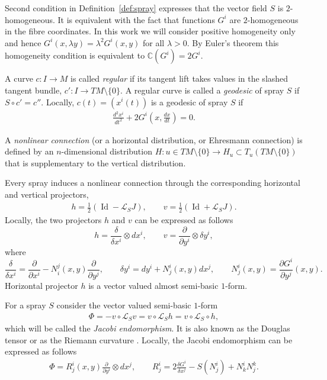 \documentclass[pdftex]{sigma}
\numberwithin{equation}{section}
\begin{document}
Second condition in Def\/inition~\ref{def:spray} expresses that the
vector f\/ield $S$ is $2$-homogeneous. It is equivalent with the
fact that functions $G^i$ are $2$-homogeneous in the f\/ibre
coordinates. In this work we will consider positive homogeneity
only and hence $G^i(x,\lambda y)=\lambda^2 G^i(x,y)$
for all $\lambda>0$. By Euler's theorem this homogeneity condition is equivalent to
$\mathbb{C}(G^i)=2G^i$.

A curve $c:I \to M$ is called \emph{regular} if its tangent lift takes
values in the slashed tangent bundle, $c': I \to
TM\setminus\{0\}$. A regular curve is called a \emph{geodesic} of
spray $S$ if $S\circ c'=c''$. Locally, $c(t)=(x^i(t))$ is a
geodesic of spray $S$ if
\begin{gather*}
\frac{d^2x^i}{dt^2}+2G^i\left(x,\frac{dx}{dt}\right)=0.
\end{gather*}

\begin{Definition} A \emph{nonlinear connection} (or a horizontal
distribution, or Ehresmann connection) is def\/ined by an
$n$-dimensional distribution $H: u\in TM\setminus\{0\} \to
H_u\subset T_u(TM\setminus\{0\})$ that is supplementary to the
vertical distribution. \end{Definition}

Every spray induces a nonlinear connection through the
corresponding horizontal and vertical projectors, \cite{grifone72}
\begin{gather*}
h=\frac{1}{2}\left(\operatorname{Id}-\mathcal{L}_SJ\right), \qquad
v=\frac{1}{2}\left(\operatorname{Id}+\mathcal{L}_SJ\right).
\end{gather*} Locally, the two projectors $h$ and $v$ can
be expressed as follows
\[
h=\frac{\delta}{\delta x^i} \otimes dx^i, \qquad
v=\frac{\partial}{\partial y^i}\otimes \delta y^i,
\] where
\[
\frac{\delta}{\delta x^i}=\frac{\partial}{\partial
x^i}-N^j_i(x,y)\frac{\partial}{\partial y^j}, \qquad \delta y^i=dy^i+
N^i_j(x,y)dx^j, \qquad N^i_j(x,y)=\frac{\partial G^i}{\partial y^j}(x,y).
\]
Horizontal projector $h$ is a vector valued almost semi-basic
$1$-form.

For a spray $S$ consider the vector valued
semi-basic $1$-form
\begin{gather*}
\Phi=-v\circ \mathcal{L}_Sv = v\circ \mathcal{L}_Sh=v\circ
\mathcal{L}_S \circ h,
\end{gather*} which will be called the
\emph{Jacobi endomorphism}. It is also known as the Douglas tensor
\cite[Def\/inition~3.17]{grifone00} or as the Riemann curvature \cite[Def\/inition~8.1.2]{shen01}.
 Locally, the Jacobi endomorphism can be expressed as follows
\begin{gather*}
\Phi= R^i_j(x,y) \frac{\partial}{\partial y^i}
\otimes dx^j, \qquad R^i_j = 2\frac{\delta G^i}{\delta x^j} -
S(N^i_j) + N^i_kN^k_j. %
\end{gather*}
\end{document}
